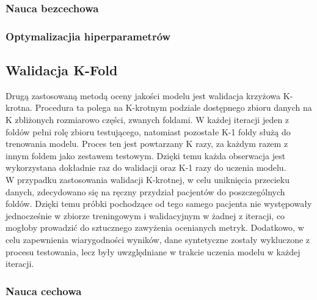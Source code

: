 \documentclass[a4paper,twoside,12pt]{book}
\begin{document}
\subsubsection*{Nauca bezcechowa}
\subsubsection*{Optymalizacjia hiperparametrów}
\newpage
\subsection{Walidacja K-Fold}
Drugą zastosowaną metodą oceny jakości modelu jest walidacja krzyżowa K-krotna. Procedura ta polega na K-krotnym podziale dostępnego zbioru danych na K zbliżonych rozmiarowo części, zwanych foldami. W każdej iteracji jeden z foldów pełni rolę zbioru testującego, natomiast pozostałe K-1 foldy służą do trenowania modelu. Proces ten jest powtarzany K razy, za każdym razem z innym foldem jako zestawem testowym. Dzięki temu każda obserwacja jest wykorzystana dokładnie raz do walidacji oraz K-1 razy do uczenia modelu.\\

W przypadku zastosowania walidacji K-krotnej, w celu uniknięcia przecieku danych, zdecydowano się na ręczny przydział pacjentów do poszczególnych foldów. Dzięki temu próbki pochodzące od tego samego pacjenta nie występowały jednocześnie w zbiorze treningowym i walidacyjnym w żadnej z iteracji, co mogłoby prowadzić do sztucznego zawyżenia ocenianych metryk. Dodatkowo, w celu zapewnienia wiarygodności wyników, dane syntetyczne zostały wykluczone z procesu testowania, lecz były uwzględniane w trakcie uczenia modelu w każdej iteracji.

\subsubsection*{Nauca cechowa}
\end{document}
